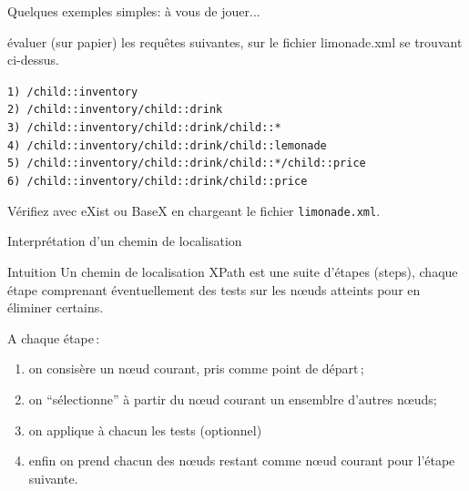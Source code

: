 \begin{frame}{Quelques exemples simples: à vous de jouer...}

\vspace{-0.3cm}

\begin{footnotesize}



\vspace{-0.3cm}

\begin{exoblock}

évaluer (sur papier) les requêtes suivantes, sur le fichier limonade.xml se trouvant ci-dessus.

\noindent \texttt{1) /child::inventory \\
2) /child::inventory/child::drink \\
3) /child::inventory/child::drink/child::*\\
4) /child::inventory/child::drink/child::lemonade\\
5) /child::inventory/child::drink/child::*/child::price\\
6) /child::inventory/child::drink/child::price\\
}

Vérifiez avec eXist ou BaseX en chargeant le fichier \texttt{limonade.xml}.
\end{exoblock}
\end{footnotesize}

\end{frame}


\begin{frame}{Interprétation d'un chemin de localisation}

\begin{block}{Intuition}
Un chemin de localisation XPath est une suite d'étapes (steps), chaque étape comprenant éventuellement des tests 
sur les n{\oe}uds atteints pour en éliminer certains.
\end{block}

\medskip
A chaque étape\,:
\begin{enumerate}
  \item on consisère un \alert{n{\oe}ud courant}, pris comme point de départ\,;
   \item on ``sélectionne'' à partir du n{\oe}ud courant un ensemblre d'autres n{\oe}uds;
   \item on applique à chacun les tests (optionnel)
   \item enfin on prend chacun des n{\oe}uds restant comme n{\oe}ud courant pour l'étape suivante.
\end{enumerate}
\end{frame}


